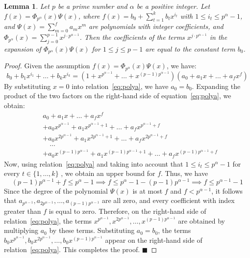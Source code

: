 \documentclass[12pt]{article}
\newtheorem{lem}[formula]{Lemma}
\begin{document}
  	\begin{lem}\label{lemb_00}
 Let $p$ be a prime number and $\alpha$ be a positive integer.
 Let $f(x) = \Phi_{p^\alpha}(x)\Psi(x)$,
 where $f(x) = b_0 + \sum_{t=1}^{k} b_t x^{i_t}$ with $1 \le i_t \le p^\alpha - 1$,
 and $\Psi(x) = \sum_{m=0}^{f} a_m x^m$
 are polynomials with integer coefficients,
 and $\Phi_{p^\alpha}(x) = \sum_{j=0}^{p-1} x^{j \cdot p^{\alpha-1}}$.
 Then the coefficients of the terms $x^{j \cdot p^{\alpha-1}}$
 in the expansion of $\Phi_{p^\alpha}(x) \Psi(x)$
 for $1 \le j \le p-1$ are equal to the constant term $b_0$.
  	\end{lem}
  	\begin{proof}
  		Given the assumption $f(x) = \Phi_{p^\alpha}(x) \Psi(x)$, we have:
  		\begin{equation}\label{eq:polya}
  			b_0 + b_1 x^{i_1} + \dots + b_k x^{i_k} = \left(1 + x^{p^{\alpha-1}} + \dots + x^{(p-1)p^{\alpha-1}}\right) \left(a_0 + a_1 x + \dots + a_f x^f\right)
  		\end{equation}
  	By substituting $x=0$ into relation~\eqref{eq:polya}, we have $a_0 = b_0$. Expanding the product of the two factors on the right-hand side of equation~\eqref{eq:polya}, we obtain:
  		\[
  	\begin{aligned}
  		&a_0 + a_1 x + \dots + a_f x^f \\
  		&+ a_0 x^{p^{\alpha-1}} + a_1 x^{p^{\alpha-1}+1} + \dots + a_f x^{p^{\alpha-1}+f} \\
  		&+ a_0 x^{2p^{\alpha-1}} + a_1 x^{2p^{\alpha-1}+1} + \dots + a_f x^{2p^{\alpha-1}+f} \\
  		&\quad \dots \\
  		&+ a_0 x^{(p-1)p^{\alpha-1}} + a_1 x^{(p-1)p^{\alpha-1}+1} + \dots + a_f x^{(p-1)p^{\alpha-1}+f}
  	\end{aligned}
  	\]
  	Now, using relation~\eqref{eq:polya} and taking into account that $1 \leq i_t \leq p^{\alpha}-1$ for every $t \in \{1, \dots, k\}$ , we obtain an upper bound for $f$. Thus, we have
  	\[
  	(p-1)p^{\alpha-1} + f \le p^\alpha - 1 \implies f \le p^\alpha - 1 - (p-1)p^{\alpha-1} \implies f \le p^{\alpha-1} - 1
  	\]
  	Since the degree of the polynomial $\Psi(x)$ is at most $f$ and $f<p^{\alpha-1}$, it follows that $a_{p^{\alpha-1}}, a_{2p^{\alpha-1}}, \ldots, a_{(p-1)p^{\alpha-1}}$ are all zero, and every coefficient with index greater than $f$ is equal to zero. Therefore, on the right-hand side of relation~\eqref{eq:polya}, the terms $x^{p^{\alpha-1}}, x^{2p^{\alpha-1}}, \ldots, x^{(p-1)p^{\alpha-1}}$ are obtained by multiplying $a_0$ by these terms. Substituting $a_0=b_0$, the terms $b_0x^{p^{\alpha-1}}, b_0x^{2p^{\alpha-1}}, \ldots, b_0x^{(p-1)p^{\alpha-1}}$ appear on the right-hand side of relation~\eqref{eq:polya}. This completes the proof.
   \hfill$\blacksquare$
  	\end{proof}
\end{document}
